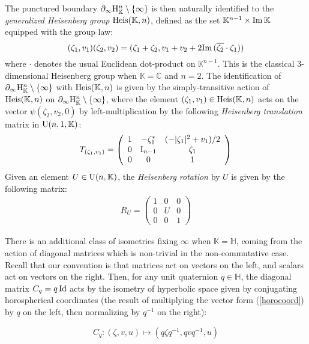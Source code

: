 \documentclass{article}[12pt]
\newcommand{\C}{\mathbb{C}}
\newcommand{\K}{\mathbb{K}}
\newcommand{\quat}{\mathbb{H}}
\begin{document}
The punctured boundary  $\partial_\infty {\rm H}_\K^n \setminus \{ \infty \}$ is then naturally identified to the \emph{generalized Heisenberg group} ${\rm Heis}(\K,n)$, defined as the set $\K^{n-1} \times {\rm Im} \, \K$ equipped with the group law:
$$(\zeta_1,v_1)(\zeta_2,v_2)=(\zeta_1+\zeta_2,v_1+v_2+2{\rm Im} \, (\overline{\zeta_2} \cdot \zeta_1))
$$
where $\cdot$ denotes the usual Euclidean dot-product on $\K^{n-1}$. This is the classical 3-dimensional Heisenberg group when $\K=\C$ and $n=2$. The identification of  $\partial_\infty {\rm H}_\K^n \setminus \{ \infty \}$ with ${\rm Heis}(\K,n)$ is given by the simply-transitive action of ${\rm Heis}(\K,n)$ on $\partial_\infty {\rm H}_\K^n \setminus \{ \infty \}$, where the element $(\zeta_1,v_1) \in {\rm Heis}(\K,n)$ acts on the vector $\psi(\zeta_2,v_2,0)$ by left-multiplication by the following \emph{Heisenberg translation} matrix in ${\rm U}(n,1,\K)$:
\begin{eqnarray}\label{heistrans}
T_{(\zeta_1,v_1)}=\left(\begin{array}{ccc}
1 & -\zeta_1^* & (-|\zeta_1|^2+v_1)/2 \\
0 & {\rm I}_{n-1} & \zeta_1 \\
0 & 0 & 1
\end{array}\right)
\end{eqnarray} 
Given an element $U \in {\rm U}(n,\K)$, the \emph{Heisenberg rotation} by $U$ is given by the following matrix:
\begin{eqnarray}\label{heisrot}
R_U=\left(\begin{array}{ccc}
1 & 0 & 0 \\
0 & U & 0 \\
0 & 0 & 1 
\end{array}\right)
\end{eqnarray}

There is an additional class of isometries fixing $\infty$ when $\K=\quat$, coming from the action of diagonal matrices which is non-trivial in the non-commutative case. Recall that our convention is that matrices act on vectors on the left, and scalars act on vectors on the right. Then, for any unit quaternion $q \in \quat$,  the diagonal matrix $C_q=q\,{\rm Id}$ acts by the isometry of hyperbolic space given by conjugating horospherical coordinates (the result of multiplying the vector form (\ref{horocoord}) by $q$ on the left, then normalizing by $q^{-1}$ on the right):

\begin{equation}\label{conj}
C_q:(\zeta,v,u) \longmapsto (q\zeta q^{-1},qvq^{-1},u)
\end{equation}  
\end{document}
